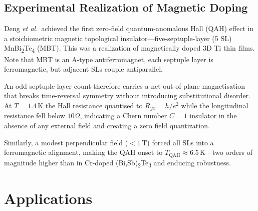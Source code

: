 \documentclass[aps,prb,twocolumn]{revtex4-2}
\begin{document}
    \subsection{Experimental Realization of Magnetic Doping}
      Deng \textit{et al.}\,\cite{deng_quantum_2020} achieved the first zero-field quantum-anomalous Hall (QAH) effect in a stoichiometric magnetic topological insulator—five-septuple-layer (5 SL) MnBi\textsubscript{2}Te\textsubscript{4} (MBT). This was a realization of magnetically doped 3D Ti thin films. Note that MBT is an A-type antiferromagnet, each septuple layer is ferromagnetic, but adjacent SLs couple antiparallel.  

      An odd septuple layer count therefore carries a net out-of-plane magnetisation that breaks time-reversal symmetry without introducing substitutional disorder. At $T = 1.4\,$K the Hall resistance quantised to $R_{yx}=h/e^{2}$ while the longitudinal resistance fell below $10\Omega$, indicating a Chern number $C=1$ insulator in the absence of any external field and creating a zero field quantization. 

      Similarly, a modest perpendicular field (${<}1\,$T) forced all SLs into a ferromagnetic alignment, making the QAH onset to $T_{\mathrm{QAH}}\approx 6.5\,$K—two orders of magnitude higher than in Cr-doped (Bi,Sb)\textsubscript{2}Te\textsubscript{3} and enducing robustness. 

  \section{Applications}
\end{document}
